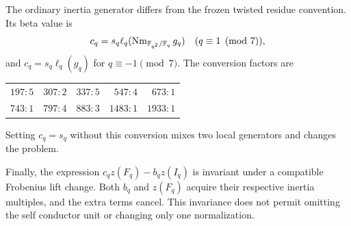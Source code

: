 The ordinary inertia generator differs from the frozen twisted residue convention. Its beta value is
\[
c_q=s_q\ell_q(\operatorname{Nm}_{\mathbb F_{q^2}/\mathbb F_q}g_q)
\quad(q\equiv1\pmod7),
\]
and $c_q=s_q\ell_q(g_q)$ for $q\equiv-1\pmod7$. The conversion factors are
\begin{center}
\begin{tabular}{rrrrr}\toprule
$197:5$&$307:2$&$337:5$&$547:4$&$673:1$\\
$743:1$&$797:4$&$883:3$&$1483:1$&$1933:1$\\\bottomrule
\end{tabular}
\end{center}
Setting $c_q=s_q$ without this conversion mixes two local generators and changes the problem.

Finally, the expression $c_qz(F_q)-b_qz(I_q)$ is invariant under a compatible Frobenius lift change. Both $b_q$ and $z(F_q)$ acquire their respective inertia multiples, and the extra terms cancel. This invariance does not permit omitting the self conductor unit or changing only one normalization.
